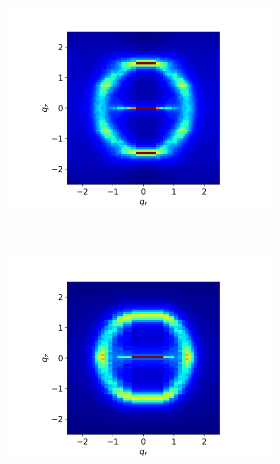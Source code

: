 \documentclass{article}
\begin{document}
\begin{figure}[ht]
\begin{subfigure}{.83\linewidth}
        \begin{subfigure}{0.4\linewidth}
                \centering
                \includegraphics[width=\linewidth, trim={2cm 0 2.5cm 1.25cm}, clip]{rzplot_layered.png}
                \caption{}~\label{fig:rz_layered}
        \end{subfigure}%
        \begin{subfigure}{0.4\linewidth}
                \centering
                \includegraphics[width=\linewidth, trim={2cm 0 2.5cm 1.25cm}, clip]{rzplot_disordered.png}
                \caption{}~\label{fig:rz_disordered}
        \end{subfigure}
  \end{subfigure}%
  \begin{subfigure}{0.14\linewidth}

\end{subfigure}
\end{figure}
\end{document}
